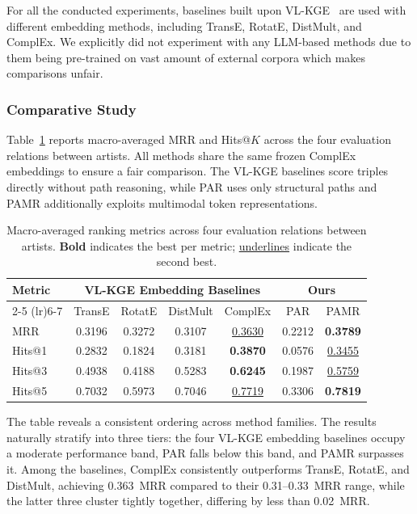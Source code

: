 \documentclass[runningheads]{llncs}
\begin{document}
For all the conducted experiments, baselines built upon VL-KGE~\cite{efthymiou2026vlkge} are used with different embedding methods, including TransE, RotatE, DistMult, and ComplEx. We explicitly did not experiment with any LLM-based methods due to them being pre-trained on vast amount of external corpora which makes comparisons unfair.

\subsubsection{Comparative Study}

Table~\ref{tab:results} reports macro-averaged MRR and Hits@$K$ across
the four evaluation relations between artists. All methods share the same
frozen ComplEx embeddings to
ensure a fair comparison. The VL-KGE baselines score triples directly
without path reasoning, while PAR uses only structural paths and PAMR
additionally exploits multimodal token representations.

\begin{table}[t]
  \centering
  \setlength{\tabcolsep}{2pt}
  \renewcommand{\arraystretch}{1.15}
  {\footnotesize
    \begin{tabular}{l|cccc|cc}
      \toprule
      \multirow{2}{*}{Metric} &
      \multicolumn{4}{|c|}{VL-KGE Embedding Baselines} &
      \multicolumn{2}{|c|}{Ours} \\
      \cmidrule(lr){2-5} \cmidrule(lr){6-7}
      & TransE & RotatE & DistMult & ComplEx & PAR & PAMR \\
      \midrule
      MRR  & 0.3196 & 0.3272 & 0.3107 & \underline{0.3630} & 0.2212 & \textbf{0.3789} \\
      Hits@1 & 0.2832 & 0.1824 & 0.3181 & \textbf{0.3870} & 0.0576 & \underline{0.3455} \\
      Hits@3 & 0.4938 & 0.4188 & 0.5283 & \textbf{0.6245} & 0.1987 & \underline{0.5759} \\
      Hits@5 & 0.7032 & 0.5973 & 0.7046 & \underline{0.7719} & 0.3306 & \textbf{0.7819} \\
      \bottomrule
  \end{tabular}}
  \caption{Macro-averaged ranking metrics across four evaluation
    relations between artists. \textbf{Bold} indicates the best per metric;
  \underline{underlines} indicate the second best.}
  \label{tab:results}
\end{table}

The table reveals a consistent ordering across method
families. The results naturally stratify into three tiers: the four
VL-KGE embedding baselines occupy a moderate performance band, PAR
falls below this band, and PAMR surpasses it. Among the baselines,
ComplEx consistently outperforms TransE, RotatE, and DistMult,
achieving 0.363~MRR compared to their 0.31--0.33~MRR range, while the
latter three cluster tightly together, differing by less than
0.02~MRR.
\end{document}
